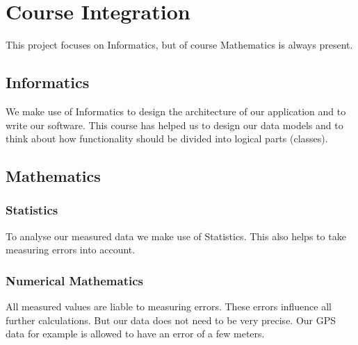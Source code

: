 \section{Course Integration}
This project focuses on Informatics, but of course Mathematics is always present.
\subsection{Informatics}
We make use of Informatics to design the architecture of our application and to write our
software. This course has helped us to design our data models and to think about how
functionality should be divided into logical parts (classes).
\subsection{Mathematics}
\subsubsection{Statistics}
To analyse our measured data we make use of Statistics. This also helps to take
measuring errors into account.
\subsubsection{Numerical Mathematics}
All measured values are liable to measuring errors. These errors influence all further
calculations. But our data does not need to be very precise. Our GPS data for example is allowed to have an error of a few meters.
